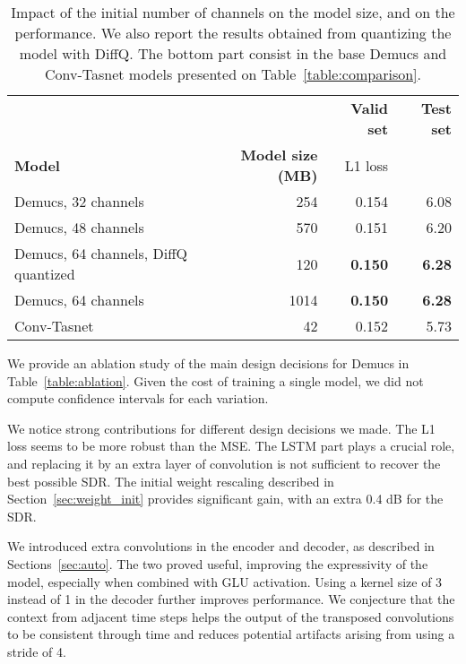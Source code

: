 \begin{table}
\caption{
Impact of the initial number of channels on the model size, and on the performance. We also report
the results obtained from quantizing the model with DiffQ.
The bottom part consist in the base Demucs and Conv-Tasnet models presented on Table~\ref{table:comparison}.
}
\label{table:quantization}
\begin{center}
  \setlength\extrarowheight{1pt}
\begin{tabular}{l r r r}
  \toprule
  & & \textbf{Valid set} & \textbf{Test set}\\
  \textbf{Model}& \textbf{Model size (MB)} & L1 loss  & \\
\midrule
  Demucs, 32 channels & 254 & 0.154 & 6.08 \\
  Demucs, 48 channels &  570 & 0.151 & 6.20\\
  \midrule
  Demucs, 64 channels, DiffQ quantized & 120 & \textbf{0.150} & \textbf{6.28} \\ 
  \midrule
  Demucs, 64 channels & 1014 & \textbf{0.150} & \textbf{6.28}\\
  Conv-Tasnet & 42 & 0.152 & 5.73\\
  \bottomrule
\end{tabular}
\end{center}
\vskip -3mm
\end{table}

We provide an ablation study of the main design decisions for Demucs in Table~\ref{table:ablation}. Given the cost of training a single model, we did not
compute confidence intervals for each variation.


We notice strong contributions for different design decisions we made. The L1 loss seems to be more robust than the MSE. The LSTM part plays a crucial role,
and replacing it by an extra layer of convolution is not sufficient to recover the best possible SDR.
The initial weight rescaling described in Section~\ref{sec:weight_init} provides significant gain, with an extra 0.4 dB for the SDR.

We introduced extra convolutions in the encoder and decoder, as described in Sections~\ref{sec:auto}. The two proved useful, 
improving the expressivity of the model, especially when combined with GLU activation.
Using a kernel size of 3 instead of 1 in the decoder
further improves performance. We conjecture that the context from adjacent time steps helps the output of the transposed convolutions to be consistent through time
and reduces potential artifacts arising from using a stride of 4.

